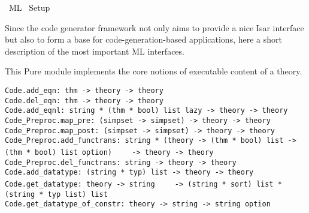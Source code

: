 %
\begin{isabellebody}%
\def\isabellecontext{ML}%
%
\isadelimtheory
%
\endisadelimtheory
%
\isatagtheory
{}\isamarkupfalse%
\ {\isachardoublequoteopen}ML{\isachardoublequoteclose}\isanewline
{}\ Setup\isanewline
{}%
\endisatagtheory
{\isafoldtheory}%
%
\isadelimtheory
%
\endisadelimtheory
%
\isamarkuptrue%
%
\begin{isamarkuptext}%
Since the code generator framework not only aims to provide
  a nice Isar interface but also to form a base for
  code-generation-based applications, here a short
  description of the most important ML interfaces.%
\end{isamarkuptext}%
\isamarkuptrue%
%
\isamarkuptrue%
%
\begin{isamarkuptext}%
This Pure module implements the core notions of
  executable content of a theory.%
\end{isamarkuptext}%
\isamarkuptrue%
%
\isamarkuptrue%
%
\isadelimmlref
%
\endisadelimmlref
%
\isatagmlref
%
\begin{isamarkuptext}%
\begin{mldecls}
  \verb|Code.add_eqn: thm -> theory -> theory| \\
  \verb|Code.del_eqn: thm -> theory -> theory| \\
  \verb|Code.add_eqnl: string * (thm * bool) list lazy -> theory -> theory| \\
  \verb|Code_Preproc.map_pre: (simpset -> simpset) -> theory -> theory| \\
  \verb|Code_Preproc.map_post: (simpset -> simpset) -> theory -> theory| \\
  \verb|Code_Preproc.add_functrans: string * (theory -> (thm * bool) list -> (thm * bool) list option)|\isasep\isanewline%
\verb|    -> theory -> theory| \\
  \verb|Code_Preproc.del_functrans: string -> theory -> theory| \\
  \verb|Code.add_datatype: (string * typ) list -> theory -> theory| \\
  \verb|Code.get_datatype: theory -> string|\isasep\isanewline%
\verb|    -> (string * sort) list * (string * typ list) list| \\
  \verb|Code.get_datatype_of_constr: theory -> string -> string option|
  \end{mldecls}


\end{isamarkuptext}
\end{isabellebody}
